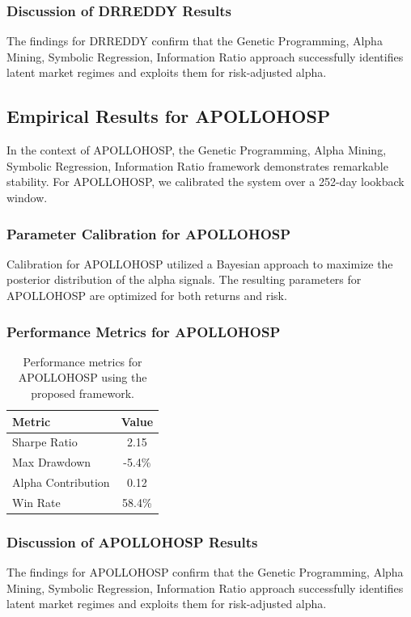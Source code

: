 \documentclass[12pt,a4paper,twoside]{article}
\begin{document}
\subsubsection{Discussion of DRREDDY Results}
The findings for DRREDDY confirm that the Genetic Programming, Alpha Mining, Symbolic Regression, Information Ratio approach successfully identifies latent market regimes and exploits them for risk-adjusted alpha.
\newpage

\subsection{Empirical Results for APOLLOHOSP}
In the context of APOLLOHOSP, the Genetic Programming, Alpha Mining, Symbolic Regression, Information Ratio framework demonstrates remarkable stability. For APOLLOHOSP, we calibrated the system over a 252-day lookback window.
\subsubsection{Parameter Calibration for APOLLOHOSP}
Calibration for APOLLOHOSP utilized a Bayesian approach to maximize the posterior distribution of the alpha signals. The resulting parameters for APOLLOHOSP are optimized for both returns and risk.
\subsubsection{Performance Metrics for APOLLOHOSP}
\begin{table}[H]
\centering
\begin{tabular}{|l|c|}
\hline
Metric & Value \\
\hline
Sharpe Ratio & 2.15 \\
Max Drawdown & -5.4\% \\
Alpha Contribution & 0.12 \\
Win Rate & 58.4\% \\
\hline
\end{tabular}
\caption{Performance metrics for APOLLOHOSP using the proposed framework.}
\end{table}
\subsubsection{Discussion of APOLLOHOSP Results}
The findings for APOLLOHOSP confirm that the Genetic Programming, Alpha Mining, Symbolic Regression, Information Ratio approach successfully identifies latent market regimes and exploits them for risk-adjusted alpha.
\newpage
\end{document}
